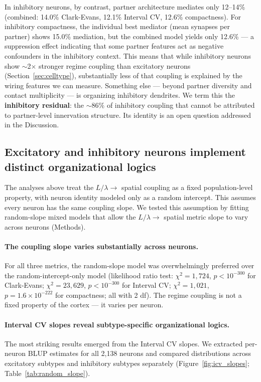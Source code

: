 \documentclass[11pt]{article}
\begin{document}
In inhibitory neurons, by contrast, partner architecture mediates only 12--14\% (combined: 14.0\% Clark-Evans, 12.1\% Interval CV, 12.6\% compactness). For inhibitory compactness, the individual best mediator (mean synapses per partner) shows 15.0\% mediation, but the combined model yields only 12.6\% --- a suppression effect indicating that some partner features act as negative confounders in the inhibitory context. This means that while inhibitory neurons show $\sim$2$\times$ stronger regime coupling than excitatory neurons (Section~\ref{sec:celltype}), substantially less of that coupling is explained by the wiring features we can measure. Something else --- beyond partner diversity and contact multiplicity --- is organizing inhibitory dendrites. We term this the \textbf{inhibitory residual}: the $\sim$86\% of inhibitory coupling that cannot be attributed to partner-level innervation structure. Its identity is an open question addressed in the Discussion.


\subsection{Excitatory and inhibitory neurons implement distinct organizational logics}
\label{sec:random_slope}

The analyses above treat the $L/\lambda \to$ spatial coupling as a fixed population-level property, with neuron identity modeled only as a random intercept. This assumes every neuron has the same coupling slope. We tested this assumption by fitting random-slope mixed models that allow the $L/\lambda \to$ spatial metric slope to vary across neurons (Methods).

\paragraph{The coupling slope varies substantially across neurons.} For all three metrics, the random-slope model was overwhelmingly preferred over the random-intercept-only model (likelihood ratio test: $\chi^2 = 1{,}724$, $p < 10^{-300}$ for Clark-Evans; $\chi^2 = 23{,}629$, $p < 10^{-300}$ for Interval CV; $\chi^2 = 1{,}021$, $p = 1.6 \times 10^{-222}$ for compactness; all with 2 df). The regime coupling is not a fixed property of the cortex --- it varies per neuron.

\paragraph{Interval CV slopes reveal subtype-specific organizational logics.} The most striking results emerged from the Interval CV slopes. We extracted per-neuron BLUP estimates for all 2,138 neurons and compared distributions across excitatory subtypes and inhibitory subtypes separately (Figure~\ref{fig:icv_slopes}; Table~\ref{tab:random_slope}).
\end{document}

